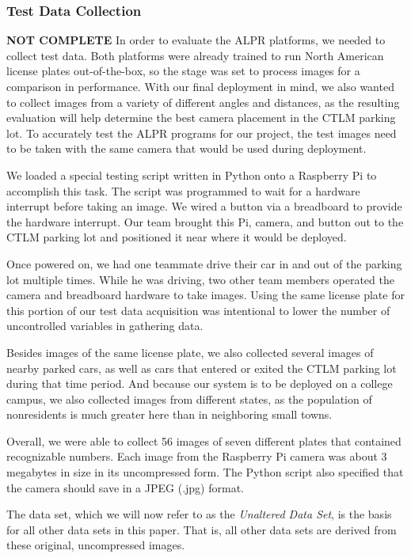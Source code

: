 \documentclass[11pt, oneside, fullpage, doublespace]{article}
\begin{document}
\subsubsection{Test Data Collection}
{\color{red}\textbf{NOT COMPLETE}}
In order to evaluate the ALPR platforms, we needed to collect test data. Both platforms were already trained to run North American license plates out-of-the-box, so the stage was set to process images for a comparison in performance. With our final deployment in mind, we also wanted to collect images from a variety of different angles and distances, as the resulting evaluation will help determine the best camera placement in the CTLM parking lot. To accurately test the ALPR programs for our project, the test images need to be taken with the same camera that would be used during deployment.

We loaded a special testing script written in Python onto a Raspberry Pi to accomplish this task. The script was programmed to wait for a hardware interrupt before taking an image. We wired a button via a breadboard to provide the hardware interrupt. Our team brought this Pi, camera, and button out to the CTLM parking lot and positioned it near where it would be deployed.

Once powered on, we had one teammate drive their car in and out of the parking lot multiple times. While he was driving, two other team members operated the camera and breadboard hardware to take images. Using the same license plate for this portion of our test data acquisition was intentional to lower the number of uncontrolled variables in gathering data.

Besides images of the same license plate, we also collected several images of nearby parked cars, as well as cars that entered or exited the CTLM parking lot during that time period. And because our system is to be deployed on a college campus, we also collected images from different states, as the population of nonresidents is much greater here than in neighboring small towns.

Overall, we were able to collect 56 images of seven different plates that contained recognizable numbers. Each image from the Raspberry Pi camera was about 3 megabytes in size in its uncompressed form. The Python script also specified that the camera should save in a JPEG (.jpg) format.

The data set, which we will now refer to as the \emph{Unaltered Data Set}, is the basis for all other data sets in this paper. That is, all other data sets are derived from these original, uncompressed images. 
\end{document}

